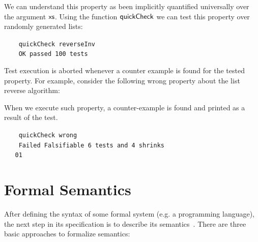 \documentclass[oneside,12pt]{scrbook}
\def\resethooks{%
	\global\let\SaveRestoreHook\empty
	\global\let\ColumnHook\empty}
\let\hspre\empty
\let\hspost\empty
\theoremstyle{definition}
\newcommand{\D}[1]{\blue{\mathsf{#1}}}
\newcommand{\F}[1]{\green{\mathsf{#1}}}
\newcommand{\V}[1]{\black{\mathsf{#1}}}
\theoremstyle{plain}
\theoremstyle{definition}
\begin{document}
We can understand this property as been implicitly quantified universally over the argument \ensuremath{\V{xs}}.
Using the function \ensuremath{\F{quickCheck}} we can test this property over randomly generated lists:
\begin{tabbing}\tt
	~~~quickCheck~reverseInv\\
	\tt ~~~~OK~passed~100~tests
\end{tabbing}

Test execution is aborted whenever a counter example is found for the tested property. For example,
consider the following wrong property about the list reverse algorithm:

\resethooks

When we execute such property, a counter-example is found and printed as a result of the test.

\begin{tabbing}\tt
	~~~quickCheck~wrong\\
	\tt ~~~~Failed~Falsifiable~6~tests~and~4~shrinks\\
	\tt ~~~01
\end{tabbing}

\section{Formal Semantics}\label{section:formalsemantics}

After defining the syntax of some formal system (e.g. a programming language), the next step in its specification is to describe its semantics~\cite{Pierce2000}. There are three basic approaches to formalize semantics:
\end{document}
